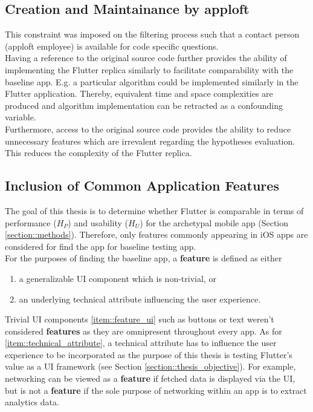 \subsection*{Creation and Maintainance by apploft}
This constraint was imposed on the filtering process such that a contact person (apploft
employee) is available for code specific questions.\\
Having a reference to the original source code further provides the ability of implementing the Flutter replica similarly to facilitate comparability with the baseline app.
E.g. a particular algorithm could be implemented similarly in the Flutter application. Thereby, equivalent time and space complexities are produced and 
algorithm implementation can be retracted as a confounding variable.\\
Furthermore, access to the original source code provides the ability to reduce unnecessary features which are irrevalent regarding the hypotheses evaluation. This reduces the complexity of the Flutter replica.

\subsection*{Inclusion of Common Application Features}
The goal of this thesis is to determine whether Flutter is comparable in terms of performance ($H_P$) and usability ($H_U$) for the archetypal mobile app (Section \ref{section::methods}). 
Therefore, only features commonly appearing in iOS apps are considered for find the app for baseline testing app.\\
For the purposes of finding the baseline app, a \textbf{feature} is defined as either
\begin{enumerate}[label=(\alph*)]
    \item a generalizable UI component which is non-trivial, or \label{item::feature_ui}
    \item an underlying technical attribute influencing the user experience. \label{item::technical_attribute}
\end{enumerate}

Trivial UI components \ref{item::feature_ui} such as buttons or text weren't considered \textbf{features} as they are omnipresent throughout every app.
As for \ref{item::technical_attribute}, a technical attribute has to influence the user experience to be incorporated as the purpose of this thesis is testing Flutter's value as a UI framework (see Section \ref{section::thesis_objective}).
For example, networking can be viewed as a \textbf{feature} if fetched data is displayed via the UI, but is not a \textbf{feature} if the sole purpose of networking within 
an app is to extract analytics data.


